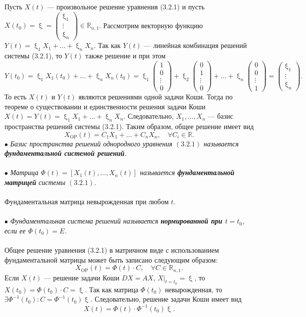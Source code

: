 \documentclass[a4paper, 12pt]{report}
\newcommand{\Rm}{\mathbb{R}}
\newcommand{\FI}{\Phi}
\renewcommand{\xi}{\upxi}
\begin{document}
Пусть $X(t)$ --- произвольное решение уравнения (3.2.1) и пусть $X(t_0) = \xi = \begin{pmatrix}
	\xi_1 \\ \vdots \\ \xi_n
\end{pmatrix} \in \Rm_{n,1}$. Рассмотрим векторную функцию $Y(t) = \xi_1X_1 + \ldots + \xi_nX_n$. Так как $Y(t)$ --- линейная комбинация решений системы (3.2.1), то $Y(t)$ также решение и при этом $$Y(t_0) = \xi_1X_1(t_0) + \ldots + \xi_nX_n(t_0) = \xi_1\begin{pmatrix}
1\\0\\\vdots\\0
\end{pmatrix} + \xi_2\begin{pmatrix}
0\\1\\\vdots\\0
\end{pmatrix} + \ldots + \xi_n\begin{pmatrix}
0\\0\\\vdots\\1
\end{pmatrix} = \begin{pmatrix}
\xi_1 \\ \vdots \\ \xi_n
\end{pmatrix}.$$
То есть $X(t)$ и $Y(t)$ являются решениями одной задачи Коши. Тогда по теореме о существовании и единственности решения задачи Коши $X(t) = Y(t) = \xi_1X_1 + \ldots + \xi_nX_n$. Следовательно, $X_1,\ldots,X_n$ --- базис пространства решений системы (3.2.1). Таким образом, общее решение имеет вид $$X_{\text{OP}}(t) = C_1X_1 + \ldots + C_nX_n,\quad \forall C_i \in \Rm.$$
$\bullet$ \textit{Базис пространства решений однородного уравнения $(3.2.1)$ называется \textbf{фундаментальной системой решений}.}\\\\
$\bullet$ \textit{Матрица $\FI(t) = [X_1(t),\ldots,X_n(t)]$ называется \textbf{фундаментальной матрицей} системы $(3.2.1)$.}\\\\
Фундаментальная матрица невырожденная при любом $t$.\\\\
$\bullet$ \textit{Фундаментальная система решений называется \textbf{нормированной при $t = t_0$}, если ее $\FI(t_0) = E$.}\\\\
Общее решение уравнения (3.2.1) в матричном виде с использованием фундаментальной матрицы может быть записано следующим образом: $$X_{\text{OP}}(t) = \FI(t)\cdot C, \quad \forall C \in \Rm_{n,1}.$$
Если $X(t)$ --- решение задачи Коши $DX = AX$, $X|_{t=t_0} = \xi$, то $X(t_0) = \FI(t_0)\cdot C = \xi$. Так как матрица $\FI(t_0)$ невырожденная, то $\exists \FI^{-1}(t_0) : C = \FI^{-1}(t_0)\xi$. Следовательно, решение задачи Коши имеет вид $$X(t) = \FI(t)\cdot \FI^{-1}(t_0)\xi.$$
\end{document}
